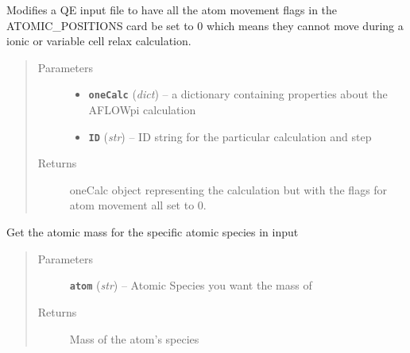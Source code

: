 \documentclass[letterpaper,10pt,english]{sphinxmanual}
\begin{document}

\begin{fulllineitems}
\label{prep:prep.__freezeAtoms}
Modifies a QE input file to have all the atom movement flags in the ATOMIC\_POSITIONS
card be set to 0 which means they cannot move during a ionic or variable cell relax
calculation.
\begin{quote}\begin{description}
\item[{Parameters}] \leavevmode\begin{itemize}
\item {} 
\textbf{\texttt{oneCalc}} (\emph{dict}) -- a dictionary containing properties about the AFLOWpi calculation

\item {} 
\textbf{\texttt{ID}} (\emph{str}) -- ID string for the particular calculation and step

\end{itemize}

\item[{Returns}] \leavevmode
oneCalc object representing the calculation but with the flags for atom
movement all set to 0.

\end{description}\end{quote}

\end{fulllineitems}


\begin{fulllineitems}
\label{prep:prep.__getAMass}
Get the atomic mass for the specific atomic species in input
\begin{quote}\begin{description}
\item[{Parameters}] \leavevmode
\textbf{\texttt{atom}} (\emph{str}) -- Atomic Species you want the mass of

\item[{Returns}] \leavevmode
Mass of the atom's species

\end{description}\end{quote}

\end{fulllineitems}
\end{document}
